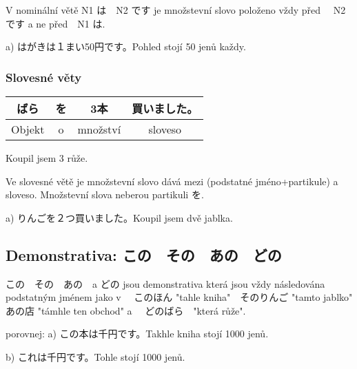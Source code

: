 V nominální větě N1 は　N2 です je množstevní slovo položeno vždy před 　N2 です a ne před　N1 は. 


a) はがきは１まい50円です。Pohled stojí 50 jenů každy.

\subsubsection{Slovesné věty}
\begin{center}
\begin{tabular}{|c|c|c|c|}
\hline
ばら&を&3本&買いました。\\
\hline
Objekt&o&množství&sloveso\\
\hline
\end{tabular}
\end{center}
Koupil jsem 3 růže.

Ve slovesné větě je množstevní slovo dává mezi (podstatné jméno+partikule) a sloveso. Množstevní slova neberou partikuli を.

a) りんごを２つ買いました。Koupil jsem dvě jablka.


\subsection{Demonstrativa: この　その　あの　どの}

この　その　あの　a どの jsou demonstrativa která jsou vždy následována podstatným jménem jako v 　このほん "tahle kniha"　そのりんご "tamto jablko"　あの店 "támhle ten obchod" a 　どのばら　"která růže".

porovnej:
a) この本は千円です。Takhle kniha stojí 1000 jenů.

b) これは千円です。Tohle stojí 1000 jenů.




